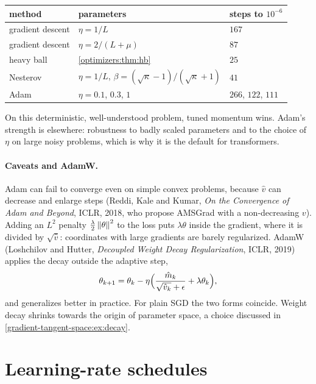 \begin{notechapter}
\begin{center}
\begin{tabular}{lll}
\toprule
method & parameters & steps to $10^{-6}$ \\
\midrule
gradient descent & $\eta = 1/L$ & $167$ \\
gradient descent & $\eta = 2/(L + \mu)$ & $87$ \\
heavy ball & \cref{optimizers:thm:hb} & $25$ \\
Nesterov & $\eta = 1/L$, $\beta = (\sqrt\kappa - 1)/(\sqrt\kappa + 1)$ & $41$ \\
Adam & $\eta = 0.1$, $0.3$, $1$ & $266$, $122$, $111$ \\
\bottomrule
\end{tabular}
\end{center}

On this deterministic, well-understood problem, tuned momentum wins. Adam's strength is
elsewhere: robustness to badly scaled parameters and to the choice of $\eta$ on large noisy
problems, which is why it is the default for transformers.

\paragraph{Caveats and AdamW.} Adam can fail to converge even on simple convex problems,
because $\hat v$ can decrease and enlarge steps (Reddi, Kale and Kumar, \emph{On the Convergence of
Adam and Beyond}, ICLR, 2018, who propose AMSGrad with a non-decreasing $v$). Adding an $L^2$
penalty $\frac\lambda2\left\|\theta\right\|^2$ to the loss puts $\lambda\theta$ inside the gradient, where it is divided by $\sqrt{\hat v}$: coordinates with
large gradients are barely regularized. AdamW (Loshchilov and Hutter, \emph{Decoupled Weight
Decay Regularization}, ICLR, 2019) applies the decay outside the adaptive step,
\[
  \theta_{k+1} = \theta_k - \eta\Bigl(\frac{\hat m_k}{\sqrt{\hat v_k} + \epsilon} + \lambda\theta_k\Bigr),
\]
and generalizes better in practice. For plain SGD the two forms coincide. Weight decay
shrinks towards the origin of parameter space, a choice discussed in
\cref{gradient-tangent-space:ex:decay}.

\section{Learning-rate schedules}\label{optimizers:sec:schedules}


\end{notechapter}
